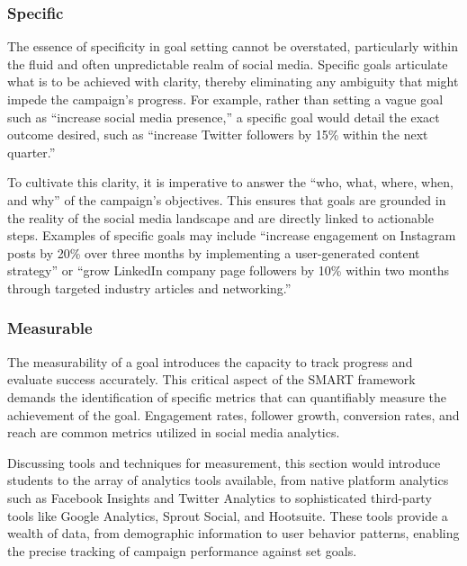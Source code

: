 \documentclass[
]{book}
\begin{document}
\hypertarget{specific}{%
\subsubsection*{Specific}\label{specific}}

The essence of specificity in goal setting cannot be overstated, particularly within the fluid and often unpredictable realm of social media. Specific goals articulate what is to be achieved with clarity, thereby eliminating any ambiguity that might impede the campaign's progress. For example, rather than setting a vague goal such as ``increase social media presence,'' a specific goal would detail the exact outcome desired, such as ``increase Twitter followers by 15\% within the next quarter.''

To cultivate this clarity, it is imperative to answer the ``who, what, where, when, and why'' of the campaign's objectives. This ensures that goals are grounded in the reality of the social media landscape and are directly linked to actionable steps. Examples of specific goals may include ``increase engagement on Instagram posts by 20\% over three months by implementing a user-generated content strategy'' or ``grow LinkedIn company page followers by 10\% within two months through targeted industry articles and networking.''

\hypertarget{measurable}{%
\subsubsection*{Measurable}\label{measurable}}

The measurability of a goal introduces the capacity to track progress and evaluate success accurately. This critical aspect of the SMART framework demands the identification of specific metrics that can quantifiably measure the achievement of the goal. Engagement rates, follower growth, conversion rates, and reach are common metrics utilized in social media analytics.

Discussing tools and techniques for measurement, this section would introduce students to the array of analytics tools available, from native platform analytics such as Facebook Insights and Twitter Analytics to sophisticated third-party tools like Google Analytics, Sprout Social, and Hootsuite. These tools provide a wealth of data, from demographic information to user behavior patterns, enabling the precise tracking of campaign performance against set goals.
\end{document}

